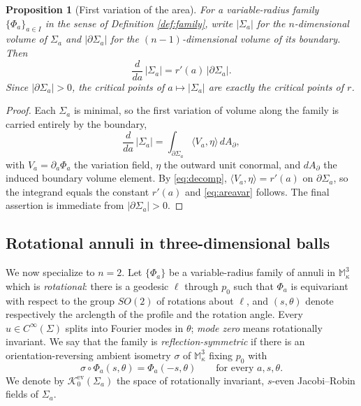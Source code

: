\documentclass[11pt,a4paper]{amsart}
\theoremstyle{plain}
\newtheorem{proposition}[theorem]{Proposition}
\theoremstyle{definition}
\newcommand{\M}{\mathbb{M}}
\newcommand{\Ker}{\mathcal{K}}
\begin{document}
\begin{proposition}[First variation of the area]\label{prop:area}
For a variable-radius family $\{\Phi_a\}_{a\in I}$ in the sense of Definition \ref{def:family}, write $|\Sigma_a|$ for the $n$-dimensional volume of $\Sigma_a$ and $|\partial\Sigma_a|$ for the $(n-1)$-dimensional volume of its boundary. Then
\begin{equation}\label{eq:areavar}
\frac{d}{da}\,|\Sigma_a|=r'(a)\,|\partial\Sigma_a|.
\end{equation}
Since $|\partial\Sigma_a|>0$, the critical points of $a\mapsto|\Sigma_a|$ are exactly the critical points of $r$.
\end{proposition}

\begin{proof}
Each $\Sigma_a$ is minimal, so the first variation of volume along the family is carried entirely by the boundary,
\[
\frac{d}{da}\,|\Sigma_a|=\int_{\partial\Sigma_a}\langle V_a,\eta\rangle\,dA_\partial,
\]
with $V_a=\partial_a\Phi_a$ the variation field, $\eta$ the outward unit conormal, and $dA_\partial$ the induced boundary volume element. By \eqref{eq:decomp}, $\langle V_a,\eta\rangle=r'(a)$ on $\partial\Sigma_a$, so the integrand equals the constant $r'(a)$ and \eqref{eq:areavar} follows. The final assertion is immediate from $|\partial\Sigma_a|>0$.
\end{proof}

\subsection*{Rotational annuli in three-dimensional balls}

We now specialize to $n=2$. Let $\{\Phi_a\}$ be a variable-radius family of annuli in $\M^3_\kappa$ which is \emph{rotational}: there is a geodesic $\ell$ through $p_0$ such that $\Phi_a$ is equivariant with respect to the group $SO(2)$ of rotations about $\ell$, and $(s,\theta)$ denote respectively the arclength of the profile and the rotation angle. Every $u\in C^\infty(\Sigma)$ splits into Fourier modes in $\theta$; \emph{mode zero} means rotationally invariant. We say that the family is \emph{reflection-symmetric} if there is an orientation-reversing ambient isometry $\sigma$ of $\M^3_\kappa$ fixing $p_0$ with
\begin{equation}\label{eq:reflection}
\sigma\circ\Phi_a(s,\theta)=\Phi_a(-s,\theta)\qquad\text{for every }a,s,\theta.
\end{equation}
We denote by $\Ker_0^{\mathrm{ev}}(\Sigma_a)$ the space of rotationally invariant, $s$-even Jacobi--Robin fields of $\Sigma_a$.
\end{document}
